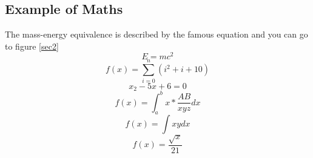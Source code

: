 \documentclass[sigconf]{acmart}
\begin{document}
    \subsection{Example of Maths}

    The mass-energy equivalence is described by the famous equation and you can go to figure \ref{sec2}
    $$E=mc^2$$
    $$f(x) =  \sum_{i=0}^{n} (i^2+i+10)  $$
    $$x_2 - 5 x + 6 = 0$$
    $$f(x)= \int_{a}^{b} x* \frac{AB}{xyz}dx$$
    $$f(x)= \int xy dx$$
    $$f(x)= \frac{\sqrt{x}}{21} $$
\end{document}
